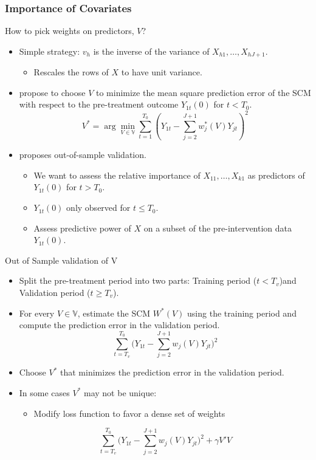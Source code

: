 \documentclass[xcolor=svgnames,t]{beamer}
\newcommand{\myitem}{\item[$\circ$]}
\begin{document}
\begin{frame}
    \frametitle{Importance of Covariates}
    How to pick weights on predictors, \(V\)?
    \begin{itemize}
        \item<1-> Simple strategy: \(v_h\) is the inverse of the variance of \(X_{h1}, \dots, X_{hJ+1}\).
        \begin{itemize}
            \item Rescales the rows of \(X\) to have unit variance.
        \end{itemize}
        \item<2-> \cite{abadie2010synthetic} propose to choose \(V\) to minimize the mean square prediction error of the SCM with respect to the pre-treatment outcome \(Y_{1t}(0)\) for \(t < T_0\).
        \[
        V^* = \arg\min_{V \in \mathbb{V}} \sum^{T_0}_{t=1} \left(Y_{1t} - \sum^{J+1}_{j=2} w^*_j(V) Y_{jt}\right)^2
        \]
        \item<3-> \cite{abadie2015comparative} proposes out-of-sample validation.
        \begin{itemize}
            \item<4-> We want to assess the relative importance of \(X_{11}, \dots, X_{k1}\) as predictors of \(Y_{1t}(0)\) for \(t > T_0\).
            \item<5-> \(Y_{1t}(0)\) only observed for \(t \leq T_0\).
            \item<6-> Assess predictive power of \(X\) on a subset of the pre-intervention data \(Y_{1t}(0)\).
        \end{itemize}
    \end{itemize}
\end{frame}


\begin{frame}{Out of Sample validation of V}
    \begin{itemize}
        \myitem<1-> Split the pre-treatment period into two parts: Training period ($t<T_v$)and Validation period ($t \geq T_v$).
        \myitem<2-> For every $V \in \mathbb{V}$, estimate the SCM $W^*(V)$ using the training period and compute the prediction error in the validation period.
        \[\sum^{T_0}_{t=T_v}\Bigg(Y_{1t}-\sum^{J+1}_{j=2}w_j(V)Y_{jt}\Bigg)^2\]
        \myitem<3-> Choose $V^*$ that minimizes the prediction error in the validation period.
        \myitem<4-> In some cases $V^*$ may not be unique:
        \begin{itemize}
            \myitem<5->  Modify loss function to favor a dense set of weights
        \end{itemize}
        \[\sum^{T_0}_{t=T_v}\Bigg(Y_{1t}-\sum^{J+1}_{j=2}w_j(V)Y_{jt}\Bigg)^2 + \gamma V'V \]
    \end{itemize}
    
\end{frame}
\end{document}
